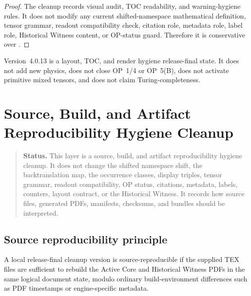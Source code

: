 \begin{proof}
The cleanup records visual audit, TOC readability, and warning-hygiene rules.
It does not modify any current shifted-namespace mathematical definition, tensor grammar,
readout compatibility check, citation role, metadata role, label role,
Historical Witness content, or OP-status guard. Therefore it is conservative
over .
\end{proof}

\begin{remark}
\label{rem:v4012-non-claim}
Version~4.0.13 is a layout, TOC, and render hygiene release-final state. It does not add
new physics, does not close OP~1/4 or OP~5(B), does not activate primitive
mixed tensors, and does not claim Turing-completeness.
\end{remark}



\clearpage
\section{ Source, Build, and Artifact Reproducibility Hygiene Cleanup}
\label{sec:v4013-source-build-artifact-reproducibility-hygiene-cleanup}

\begin{quote}\small
\noindent\textbf{Status.}
This  layer is a source, build, and artifact reproducibility hygiene
cleanup. It does not change the shifted namespace shift, the backtranslation map,
the occurrence classes, display triples, tensor grammar, readout compatibility,
OP status, citations, metadata, labels, counters, layout contract, or the
Historical Witness. It records how source files, generated PDFs, manifests,
checksums, and bundles should be interpreted.
\end{quote}

\subsection{Source reproducibility principle}
\label{subsec:v4013-source-reproducibility-principle}

\begin{definition}
\label{def:v4013-source-reproducibility-principle}
A local release-final cleanup version is source-reproducible if the supplied TEX files are
sufficient to rebuild the Active Core and Historical Witness PDFs in the same
logical document state, modulo ordinary build-environment differences such as
PDF timestamps or engine-specific metadata.
\end{definition}

